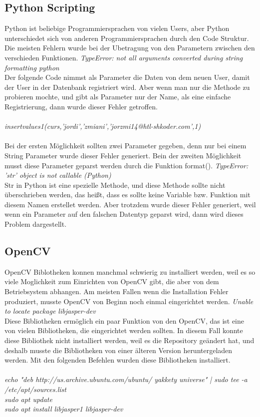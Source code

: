 \subsection{Python Scripting}
Python ist beliebige Programmiersprachen von vielen Users, aber Python unterschiedet sich von anderen Programmiersprachen durch den Code Struktur. Die meisten Fehlern wurde bei der Ubetragung von den Parametern zwischen den verschieden Funktionen.
\bigbreak
\textit{TypeError: not all arguments converted during string formatting python}\\
Der folgende Code nimmst als Parameter die Daten von dem neuen User, damit der User in der Datenbank registriert wird. Aber wenn man nur die Methode zu probieren mochte, und gibt als Parameter nur der Name, als eine einfache Registrierung, dann wurde dieser Fehler getroffen. \\\\
\textit{insertvalues1(curs,'jordi','zmiani','jorzmi14@htl-shkoder.com',1)}\\\\
Bei der ersten Möglichkeit sollten zwei Parameter gegeben, denn nur bei einem String Parameter wurde dieser Fehler generiert.
Bein der zweiten Möglichkeit musst diese Parameter geparst werden durch die Funktion format().
\bigbreak
\textit{TypeError: 'str' object is not callable (Python)}\\
Str in Python ist eine spezielle Methode, und diese Methode sollte nicht überschrieben werden, das heißt, dass es sollte keine Variable bzw. Funktion mit diesem Namen erstellet werden. Aber trotzdem wurde dieser Fehler generiert, weil wenn ein Parameter auf den falschen Datentyp geparst wird, dann wird dieses Problem dargestellt.
\subsection{OpenCV}
OpenCV Biblotheken konnen manchmal schwierig zu installiert werden, weil es so viele Moglichkeit zum Einrichten von OpenCV gibt, die aber von dem Betriebsystem abhangen. Am meisten Fallen wenn die Installation Fehler produziert, musste OpenCV von Beginn noch einmal eingerichtet werden.
\bigbreak
\textit{Unable to locate package libjasper-dev}\\
Diese Bibliotheken ermöglich ein paar Funktion von den OpenCV, das ist eine von vielen Bibliotheken, die eingerichtet werden sollten. In diesem Fall konnte diese Bibliothek nicht installiert werden, weil es die Repository geändert hat, und deshalb musste die Bibliotheken von einer älteren Version heruntergeladen werden. Mit den folgenden Befehlen wurden diese Bibliotheken installiert.\\\\
\textit{echo "deb http://us.archive.ubuntu.com/ubuntu/ yakkety universe" | sudo tee -a \\ /etc/apt/sources.list}\\
\textit{sudo apt update}\\
\textit{sudo apt install libjasper1 libjasper-dev}

